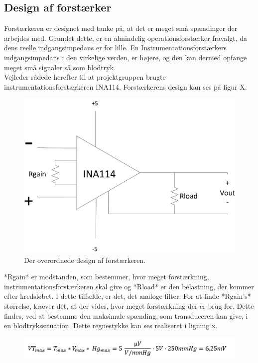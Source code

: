 \subsection{Design af forstærker}
Forstærkeren er designet med tanke på, at det er meget små spændinger der arbejdes med. Grundet dette, er en almindelig operationsforstærker fravalgt, da dens reelle indgangsimpedans er for lille. En Instrumentationsforstærkers indgangsimpedans i den virkelige verden, er højere, og den kan dermed opfange meget små signaler så som blodtryk.\\
Vejleder rådede herefter til at projektgruppen brugte instrumentationsforstærkeren INA114. Forstærkerens design kan ses på figur X.\\ 
\begin{figure}[h]
	\centering
	\includegraphics[width=1\textwidth]{Figurer/Forstaerker}
	\caption{Der overordnede design af forstærkeren.}\label{labelpic}
\end{figure}
*Rgain* er modstanden, som bestemmer, hvor meget forstærkning, instrumentationsforstærkeren skal give og *Rload* er den belastning, der kommer efter kredsløbet. I dette tilfælde, er det, det analoge filter. For at finde *Rgain’s* størrelse, kræver det, at der vides, hvor meget forstærkning der er brug for. Dette findes, ved at bestemme den maksimale spænding, som transduceren kan give, i en blodtrykssituation. Dette regnestykke kan ses realiseret i ligning x.\\
\begin{figure}[h]
	\centering
	\includegraphics[width=1\textwidth]{Figurer/LigningSara}
\end{figure}

